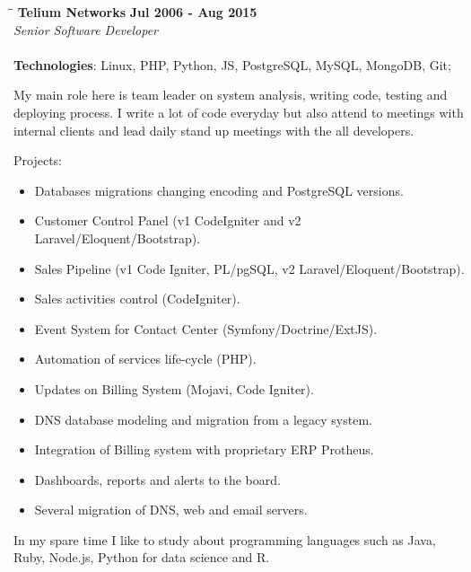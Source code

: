 \documentclass[margin]{res}
\begin{document}
\begin{resume}
\vspace{-0.1in}
   \begin{tabbing}
   \hspace{2.3in}\= \hspace{1.7in}\= \kill %
    \textbf{Telium Networks}    \>\>\textbf{Jul 2006 - Aug 2015}\\
    \textit{Senior Software Developer} \\ \\        
    \textbf{Technologies}: Linux, PHP, Python, JS, PostgreSQL, MySQL, MongoDB, Git;
   \end{tabbing}\vspace{-20pt}      %
    \vspace{2mm}
    My main role here is team leader on system analysis, writing code, testing and deploying process. I write a lot of code everyday but also attend to meetings with internal clients and lead daily stand up meetings with the all developers.

    Projects:
    \begin{itemize}
      \item Databases migrations changing encoding and PostgreSQL versions.
      \item Customer Control Panel (v1 CodeIgniter and v2 Laravel/Eloquent/Bootstrap).
      \item Sales Pipeline (v1 Code Igniter, PL/pgSQL, v2 Laravel/Eloquent/Bootstrap).
      \item Sales activities control (CodeIgniter).
      \item Event System for Contact Center (Symfony/Doctrine/ExtJS).
      \item Automation of services life-cycle (PHP).
      \item Updates on Billing System (Mojavi, Code Igniter).
      \item DNS database modeling and migration from a legacy system.
      \item Integration of Billing system with proprietary ERP Protheus.
      \item Dashboards, reports and alerts to the board.
      \item Several migration of DNS, web and email servers.
    \end{itemize}

In my spare time I like to study about programming languages such as Java, Ruby, Node.js, Python for data science and R.


\end{resume}
\end{document}
